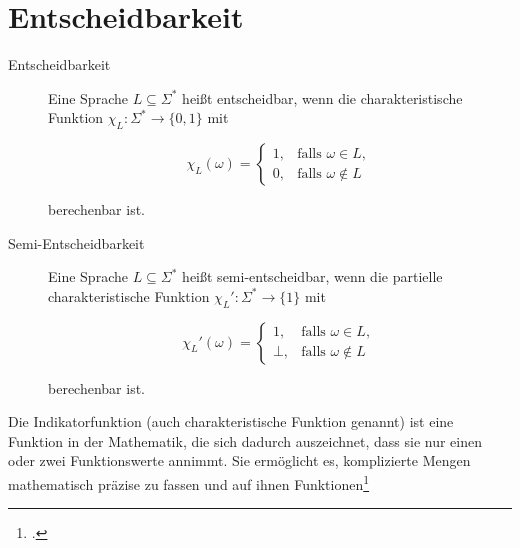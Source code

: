\documentclass{lehramt-informatik-haupt}
\begin{document}

\chapter{Entscheidbarkeit}

\begin{liQuellen}
\item \cite[Seite 309-312]{hoffmann}
\item \cite{wiki:entscheidbar}
\item \cite[Kapitel 19.2.3.1 Entscheidbarkeit und Semientscheidbarkeit, Seite 596-597]{schneider}
\end{liQuellen}

\begin{description}
\item[Entscheidbarkeit]

Eine Sprache $L \subseteq \Sigma^*$ heißt entscheidbar, wenn die
charakteristische Funktion $\chi_{L} : \Sigma^* \rightarrow \{0,1\}$ mit

\begin{equation*}
\chi _{L}(\omega)=
\begin{cases}
1,& \text{falls } \omega \in L,\\
0,& \text{falls } \omega \notin L
\end{cases}
\end{equation*}

berechenbar ist.

\item[Semi-Entscheidbarkeit]

Eine Sprache $L \subseteq \Sigma^*$ heißt semi-entscheidbar, wenn die
partielle charakteristische Funktion $\chi_{L}' : \Sigma^* \rightarrow
\{ 1 \}$ mit

\begin{equation*}
\chi _{L}'(\omega)=
\begin{cases}
1,& \text{falls } \omega \in L,\\
\bot,& \text{falls } \omega \notin L
\end{cases}
\end{equation*}

berechenbar ist.
\end{description}

\begin{liExkurs}
Die Indikatorfunktion (auch charakteristische Funktion genannt) ist eine
Funktion in der Mathematik, die sich dadurch auszeichnet, dass sie
nur einen oder zwei Funktionswerte annimmt. Sie ermöglicht es,
komplizierte Mengen mathematisch präzise zu fassen und auf ihnen
Funktionen\footcite{wiki:charakteristische-funktion}
\end{liExkurs}
\end{document}
